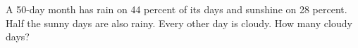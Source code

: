 A 50-day month has rain on 44 percent of its days and sunshine on 28 percent. Half the sunny days are also rainy. Every other day is cloudy. How many cloudy days?
